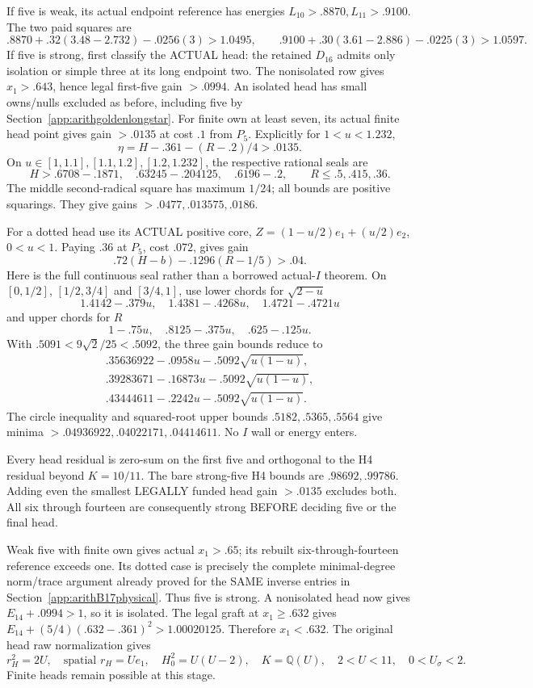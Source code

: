 \documentclass[11pt]{article}
\begin{document}
If five is weak, its actual endpoint reference
has energies \(L_{10}>.8870,L_{11}>.9100\).
The two paid squares are
\[
 .8870+.32(3.48-2.732)-.0256(3)>1.0495,\qquad
 .9100+.30(3.61-2.886)-.0225(3)>1.0597 .
\]
If five is strong, first classify the ACTUAL
head: the retained \(D_{16}\) admits only isolation
or simple three at its long endpoint two.
The nonisolated row gives \(x_1>.643\), hence
legal first-five gain \(>.0994\).
An isolated head has small owns/nulls excluded
as before, including five by
Section~\ref{app:arithgoldenlongstar}.
For finite own at least seven, its actual finite
head point gives gain \(>.0135\) at cost \(.1\)
from \(P_5\).
Explicitly for \(1<u<1.232\),
\[
 \eta=H-.361-(R-.2)/4>.0135 .
\]
On \(u\in[1,1.1],[1.1,1.2],[1.2,1.232]\),
the respective rational seals are
\[
 H>.6708-.1871,\quad .63245-.204125,\quad .6196-.2,
 \qquad R\le.5,.415,.36 .
\]
The middle second-radical square has maximum
\(1/24\); all bounds are positive squarings.
They give gains \(>.0477,.013575,.0186\).

For a dotted head use its ACTUAL positive core,
\(Z=(1-u/2)e_1+(u/2)e_2\), \(0<u<1\).
Paying \(.36\) at \(P_5\), cost \(.072\),
gives gain
\[
                .72(H-b)-.1296(R-1/5)>.04 .
\tag{D17H}\label{eq:arithD17dotgain}
\]
Here is the full continuous seal rather than a
borrowed actual-\(I\) theorem.
On \([0,1/2]\), \([1/2,3/4]\) and \([3/4,1]\), use lower
chords for \(\sqrt{2-u}\)
\[
1.4142-.379u,\quad1.4381-.4268u,\quad1.4721-.4721u
\]
and upper chords for \(R\)
\[
1-.75u,\quad.8125-.375u,\quad.625-.125u.
\]
With \(.5091<9\sqrt2/25<.5092\), the three
gain bounds reduce to
\[
\begin{array}{l}
 .35636922-.0958u-.5092\sqrt{u(1-u)},\\
 .39283671-.16873u-.5092\sqrt{u(1-u)},\\
 .43444611-.2242u-.5092\sqrt{u(1-u)} .
\end{array}
\]
The circle inequality and squared-root upper
bounds \(.5182,.5365,.5564\) give minima
\(>.04936922,.04022171,.04414611\).
No \(I\) wall or energy enters.

Every head residual is zero-sum on the first
five and orthogonal to the H4 residual beyond
\(K=10/11\).
The bare strong-five H4 bounds are
\(.98692,.99786\).
Adding even the smallest LEGALLY funded head
gain \(>.0135\) excludes both.
All six through fourteen are consequently strong
BEFORE deciding five or the final head.

Weak five with finite own gives actual
\(x_1>.65\); its rebuilt six-through-fourteen
reference exceeds one.
Its dotted case is precisely the complete
minimal-degree norm/trace argument already
proved for the SAME inverse entries in
Section~\ref{app:arithB17physical}.
Thus five is strong.
A nonisolated head now gives
\(E_{14}+.0994>1\), so it is isolated.
The legal graft at \(x_1\ge.632\) gives
\(E_{14}+(5/4)(.632-.361)^2>1.00020125\).
Therefore \(x_1<.632\).
The original head raw normalization gives
\[
 r_H^2=2U,\quad\text{spatial }r_H=Ue_1,\quad
 H_0^2=U(U-2),\quad K=\mathbb Q(U),\quad
               2<U<11,\quad0<U_\sigma<2 .
\]
Finite heads remain possible at this stage.
\end{document}
